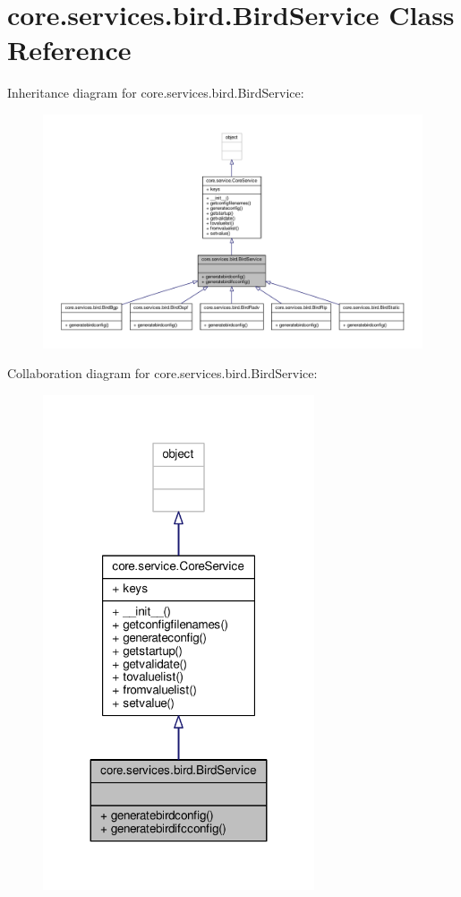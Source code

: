 \hypertarget{classcore_1_1services_1_1bird_1_1_bird_service}{\section{core.\+services.\+bird.\+Bird\+Service Class Reference}
\label{classcore_1_1services_1_1bird_1_1_bird_service}
}


Inheritance diagram for core.\+services.\+bird.\+Bird\+Service\+:
\nopagebreak
\begin{figure}[H]
\begin{center}
\leavevmode
\includegraphics[width=350pt]{classcore_1_1services_1_1bird_1_1_bird_service__inherit__graph}
\end{center}
\end{figure}


Collaboration diagram for core.\+services.\+bird.\+Bird\+Service\+:
\nopagebreak
\begin{figure}[H]
\begin{center}
\leavevmode
\includegraphics[width=227pt]{classcore_1_1services_1_1bird_1_1_bird_service__coll__graph}
\end{center}
\end{figure}
